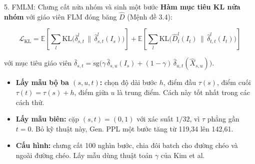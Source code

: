 \begin{frame}{5. FMLM: Chưng cất nửa nhóm và sinh một bước}
    \textbf{Hàm mục tiêu KL nửa nhóm} với giáo viên FLM đóng băng $\hat{D}$ (Mệnh đề 3.4):
    \begin{small}
    $$\mathcal{L}_{\text{KL}} = \mathbb{E}\!\left[\sum_l \mathrm{KL}\big(\bar\delta^{l}_{s,t} \,\|\, \hat\delta^{l}_{s,t}(I_s)\big)\right] + \mathbb{E}\!\left[\sum_l \mathrm{KL}\big(\hat D^{l}_t(I_t) \,\|\, \hat\delta^{l}_{t,t}(I_t)\big)\right]$$
    \end{small}
    với mục tiêu giáo viên $\bar\delta_{s,t} = \mathrm{sg}\big(\gamma\,\hat\delta_{s,u}(I_s) + (1-\gamma)\,\hat\delta_{u,t}(\hat X_{s,u})\big)$.
    \begin{itemize}
        \item \textbf{Lấy mẫu bộ ba $(s,u,t)$:} chọn độ dài bước $h$, điểm đầu $\tau(s)$, điểm cuối $\tau(t) = \tau(s)+h$, điểm giữa $u$ là trung điểm. Cách này tốt nhất trong các cách thử.
        \item \textbf{Lấy mẫu biên:} cặp $(s,t) = (0,1)$ với xác suất $1/32$, vì $\tau$ phẳng gần $t=0$. Bỏ kỹ thuật này, Gen. PPL một bước tăng từ 119,34 lên 142,61.
        \item \textbf{Cấu hình:} chưng cất 100 nghìn bước, chia đôi batch cho đường chéo và ngoài đường chéo. Lấy mẫu dùng thuật toán $\gamma$ của Kim et al.
    \end{itemize}
\end{frame}

